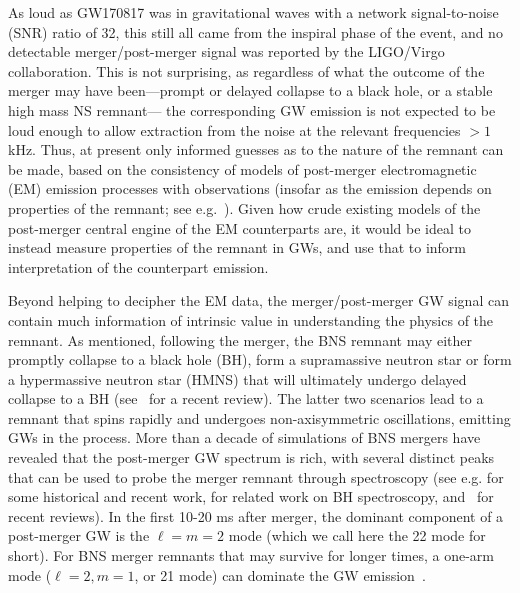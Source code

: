\documentclass[prd,aps,floatfix,superscriptaddress,nofootinbib,twocolumn,10pt,English]{revtex4-1}
\begin{document}
{As loud as GW170817 was in gravitational waves with a network
signal-to-noise (SNR) ratio of 32, this still all came from the
inspiral phase of the event, and no detectable merger/post-merger
signal was reported by the LIGO/Virgo collaboration.  This is not
surprising, as regardless of what the outcome of the merger may have
been---prompt or delayed collapse to a black hole, or a stable high
mass NS remnant--- the corresponding GW emission is not expected to be
loud enough to allow extraction from the noise at the relevant
frequencies $> 1$kHz. Thus, at present only informed guesses as to the
nature of the remnant can be made, based on the consistency of models
of post-merger electromagnetic (EM) emission processes with
observations (insofar as the emission depends on properties of the
remnant; see e.g.~\cite{Metzger:2017wot}). Given how crude existing
models of the post-merger central engine of the EM counterparts are,
it would be ideal to instead measure properties of the remnant in GWs,
and use that to inform interpretation of the counterpart emission.

Beyond helping to decipher the EM data, the merger/post-merger GW signal
can contain much information of intrinsic value in understanding the physics
of the remnant. As mentioned, following the merger, the BNS
remnant may either promptly collapse to a black hole (BH), form a
supramassive neutron star or form a hypermassive neutron star (HMNS)
that will ultimately undergo delayed collapse to a BH
(see~\cite{Paschalidis:2016agf} for a recent review). The latter two
scenarios lead to a remnant that spins rapidly and undergoes
non-axisymmetric oscillations, emitting GWs in the process. More than
a decade of simulations of BNS mergers have revealed that the
post-merger GW spectrum is rich, with several distinct peaks that can
be used to probe the merger remnant through spectroscopy (see
e.g. \cite{Oechslin2002PhRvD..65j3005O,ShibataUryu2002,Shibata2005PhRvD..71h4021S,Shibata:2006nm,Kiuchi2009PhRvD..80f4037K,Bauswein:2011tp,Takami2014,bauswein2015exploring,Palenzuela:2015dqa,Lehner:2016lxy,Rezzolla:2016nxn,Dietrich:2016lyp,Radice:2016rys}
for some historical and recent work,
\cite{PhysRevD.86.104006,PhysRevD.88.044047,PhysRevD.87.041502,PhysRevLett.114.081101}
for related work on BH spectroscopy,
and~\cite{Baiotti:2016qnr,Paschalidis:2016vmz} for recent reviews). In
the first 10-20 ms after merger, the dominant component of a
post-merger GW is the $\ell=m=2$ mode (which we call here the 22 mode
for short). For BNS merger remnants that may survive for longer times,
a one-arm mode ($\ell=2,m=1$, or 21 mode) can dominate the GW
emission~\cite{Paschalidis:2015mla,East:2015vix,East:2016zvv,Lehner:2016wjg,Radice:2016gym}.

}
\end{document}
